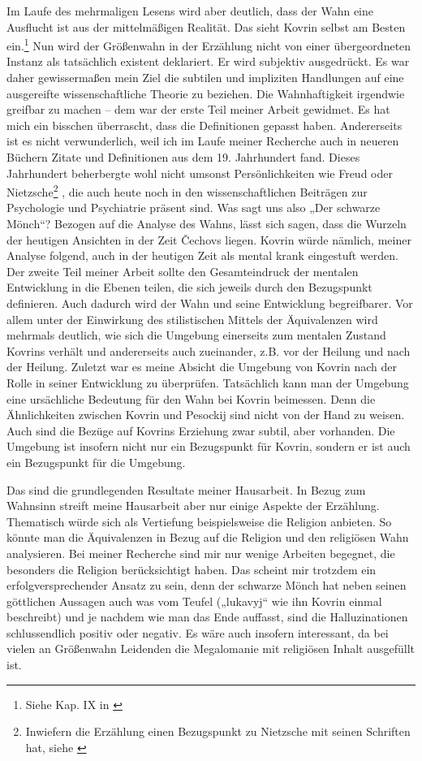 \documentclass[12pt,headsepline,a4paper]{scrartcl}
\begin{document}
Im Laufe des mehrmaligen Lesens wird aber deutlich, dass der Wahn eine Ausflucht ist aus der
mittelmäßigen Realität. Das sieht Kovrin selbst am Besten ein.\footnote{
Siehe Kap. IX in \autocite{blackmonk}} Nun wird der Größenwahn in der
Erzählung nicht von einer übergeordneten Instanz als tatsächlich existent deklariert. Er wird
subjektiv ausgedrückt. Es war daher gewissermaßen mein Ziel die subtilen und impliziten
Handlungen auf eine ausgereifte wissenschaftliche Theorie zu beziehen. Die Wahnhaftigkeit
irgendwie greifbar zu machen -- dem war der erste Teil meiner Arbeit gewidmet.
Es hat mich ein bisschen überrascht, dass die Definitionen gepasst haben. Andererseits ist es nicht
verwunderlich, weil ich im Laufe meiner Recherche auch in neueren Büchern Zitate und
Definitionen aus dem 19. Jahrhundert fand. Dieses Jahrhundert beherbergte wohl nicht
umsonst Persönlichkeiten wie Freud oder Nietzsche\footnote{
Inwiefern die Erzählung einen Bezugspunkt zu Nietzsche mit seinen Schriften hat, siehe \autocite{winner}
} , die auch heute noch in den
wissenschaftlichen Beiträgen zur Psychologie und Psychiatrie präsent sind.
Was sagt uns also „Der schwarze Mönch“? Bezogen auf die Analyse des Wahns, lässt sich sagen,
dass die Wurzeln der heutigen Ansichten in der Zeit Čechovs liegen. Kovrin würde nämlich, meiner
Analyse folgend, auch in der heutigen Zeit als mental krank eingestuft werden.
Der zweite Teil meiner Arbeit sollte den Gesamteindruck der mentalen Entwicklung in die Ebenen
teilen, die sich jeweils durch den Bezugspunkt definieren. Auch dadurch wird der Wahn und seine
Entwicklung begreifbarer. Vor allem unter der Einwirkung des stilistischen Mittels der
Äquivalenzen wird mehrmals deutlich, wie sich die Umgebung einerseits zum mentalen Zustand
Kovrins verhält und andererseits auch zueinander, z.B. vor der Heilung und nach der Heilung.
Zuletzt war es meine Absicht die Umgebung von Kovrin nach der Rolle in seiner Entwicklung zu
überprüfen. Tatsächlich kann man der Umgebung eine ursächliche Bedeutung für den Wahn bei
Kovrin beimessen. Denn die Ähnlichkeiten zwischen Kovrin und Pesockij sind nicht von der Hand
zu weisen. Auch sind die Bezüge auf Kovrins Erziehung zwar subtil, aber vorhanden. Die
Umgebung ist insofern nicht nur ein Bezugspunkt für Kovrin, sondern er ist auch ein Bezugspunkt
für die Umgebung.

Das sind die grundlegenden Resultate meiner Hausarbeit. In Bezug zum Wahnsinn streift meine
Hausarbeit aber nur einige Aspekte der Erzählung. Thematisch würde sich als Vertiefung
beispielsweise die Religion anbieten. So könnte man die Äquivalenzen in Bezug auf die Religion
und den religiösen Wahn analysieren. Bei meiner Recherche sind mir nur wenige Arbeiten
begegnet, die besonders die Religion berücksichtigt haben.\autocite{strelcova} Das scheint mir trotzdem ein
erfolgversprechender Ansatz zu sein, denn der schwarze Mönch hat neben seinen göttlichen
Aussagen auch was vom Teufel („lukavyj“ wie ihn Kovrin einmal beschreibt) und je nachdem wie
man das Ende auffasst, sind die Halluzinationen schlussendlich positiv oder negativ. Es wäre auch
insofern interessant, da bei vielen an Größenwahn Leidenden die Megalomanie mit religiösen Inhalt
ausgefüllt ist.

\printbibliography
\end{document}
